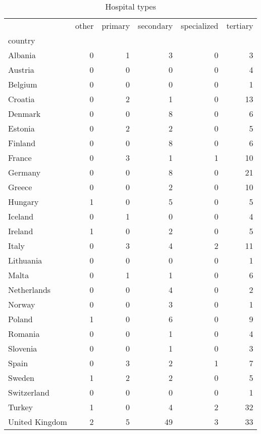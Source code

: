 \begin{table}[h]
\caption{Hospital types}
\label{tab:hospitals}
\begin{tabular}{lrrrrr}
\toprule
 & other & primary & secondary & specialized & tertiary \\
country &  &  &  &  &  \\
\midrule
Albania & 0 & 1 & 3 & 0 & 3 \\
Austria & 0 & 0 & 0 & 0 & 4 \\
Belgium & 0 & 0 & 0 & 0 & 1 \\
Croatia & 0 & 2 & 1 & 0 & 13 \\
Denmark & 0 & 0 & 8 & 0 & 6 \\
Estonia & 0 & 2 & 2 & 0 & 5 \\
Finland & 0 & 0 & 8 & 0 & 6 \\
France & 0 & 3 & 1 & 1 & 10 \\
Germany & 0 & 0 & 8 & 0 & 21 \\
Greece & 0 & 0 & 2 & 0 & 10 \\
Hungary & 1 & 0 & 5 & 0 & 5 \\
Iceland & 0 & 1 & 0 & 0 & 4 \\
Ireland & 1 & 0 & 2 & 0 & 5 \\
Italy & 0 & 3 & 4 & 2 & 11 \\
Lithuania & 0 & 0 & 0 & 0 & 1 \\
Malta & 0 & 1 & 1 & 0 & 6 \\
Netherlands & 0 & 0 & 4 & 0 & 2 \\
Norway & 0 & 0 & 3 & 0 & 1 \\
Poland & 1 & 0 & 6 & 0 & 9 \\
Romania & 0 & 0 & 1 & 0 & 4 \\
Slovenia & 0 & 0 & 1 & 0 & 3 \\
Spain & 0 & 3 & 2 & 1 & 7 \\
Sweden & 1 & 2 & 2 & 0 & 5 \\
Switzerland & 0 & 0 & 0 & 0 & 1 \\
Turkey & 1 & 0 & 4 & 2 & 32 \\
United Kingdom & 2 & 5 & 49 & 3 & 33 \\
\bottomrule
\end{tabular}
\end{table}
